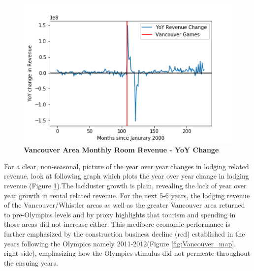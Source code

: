 \documentclass[11pt, twocolumn]{article}
\begin{document}
    \begin{figure}[H]
        \centering
            \includegraphics[scale=0.55]{Vancouver_Area_Deseasoned_Room_Revenue.png}
        \caption{\textbf{Vancouver Area Monthly Room Revenue - YoY Change}}
        \label{fig:Vancouver_Room_rev_YoY}
    \end{figure}
    
    For a clear, non-seasonal, picture of the year over year changes in lodging related revenue, look at following graph which plots the year over year change in lodging revenue (Figure \ref{fig:Vancouver_Room_rev_YoY}).The lackluster growth is plain, revealing the lack of year over year growth in rental related revenue. For the next 5-6 years, the lodging revenue of the Vancouver/Whistler areas as well as the greater Vancouver area returned to pre-Olympics levels and by proxy highlights that tourism and spending in those areas did not increase either. This mediocre economic performance is further emphasized by the construction business decline (red) established in the years following the Olympics namely 2011-2012(Figure \ref{fig:Vancouver_map}, right side), emphasizing how the Olympics stimulus did not permeate throughout the ensuing years. 
    
\end{document}
